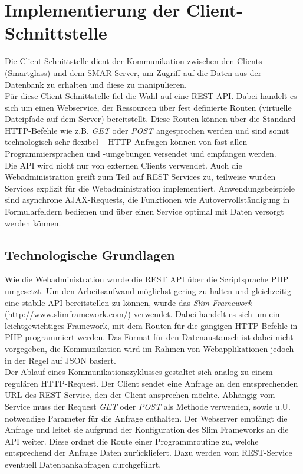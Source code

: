 \chapter{Implementierung der Client-Schnittstelle}
\label{cha:impl_api}

Die Client-Schnittstelle dient der Kommunikation zwischen den Clients (\zB Smart\-glass) und dem \acs{SMAR}-Server, um Zugriff auf die Daten aus der Datenbank zu erhalten und diese zu manipulieren.\\

Für diese Client-Schnittstelle fiel die Wahl auf eine \acs{REST} \acs{API}. Dabei handelt es sich um einen Webservice, der Ressourcen über fest definierte Routen (virtuelle Dateipfade auf dem Server) bereitstellt. Diese Routen können über die Standard-\acs{HTTP}-Befehle wie z.B. \emph{GET} oder \emph{POST} angesprochen werden und sind somit technologisch sehr flexibel -- \acs{HTTP}-Anfragen können von fast allen Programmiersprachen und -umgebungen versendet und empfangen werden.\\

Die \acs{API} wird nicht nur von externen Clients verwendet. Auch die Webadministration greift zum Teil auf \acs{REST} Services zu, teilweise wurden Services explizit für die Webadministration implementiert. Anwendungsbeispiele sind asynchrone \acs{AJAX}-Requests, die Funktionen wie Autovervollständigung in Formularfeldern bedienen und über einen Service optimal mit Daten versorgt werden können.

\section{Technologische Grundlagen}
Wie die Webadministration wurde die \acs{REST} \acs{API} über die Scriptsprache \acs{PHP} umgesetzt. Um den Arbeitsaufwand möglichst gering zu halten und gleichzeitig eine stabile API bereitstellen zu können, wurde das \emph{Slim Framework} (\url{http://www.slimframework.com/}) verwendet. Dabei handelt es sich um ein leichtgewichtiges Framework, mit dem Routen für die gängigen \acs{HTTP}-Befehle in \acs{PHP} programmiert werden. Das Format für den Datenaustausch ist dabei nicht vorgegeben, die Kommunikation wird im Rahmen von Webapplikationen jedoch in der Regel auf \ac{JSON} basiert.\\

Der Ablauf eines Kommunikationszyklusses gestaltet sich analog zu einem regulären \acs{HTTP}-Request. Der Client sendet eine Anfrage an den entsprechenden \acs{URL} des \acs{REST}-Service, den der Client ansprechen möchte. Abhängig vom Service muss der Request \emph{GET} oder \emph{POST} als Methode verwenden, sowie u.U. notwendige Parameter für die Anfrage enthalten. Der Webserver empfängt die Anfrage und leitet sie aufgrund der Konfiguration des Slim Frameworks an die \acs{API} weiter. Diese ordnet die Route einer Programmroutine zu, welche entsprechend der Anfrage Daten zurückliefert. Dazu werden vom REST-Service eventuell Datenbankabfragen durchgeführt.

